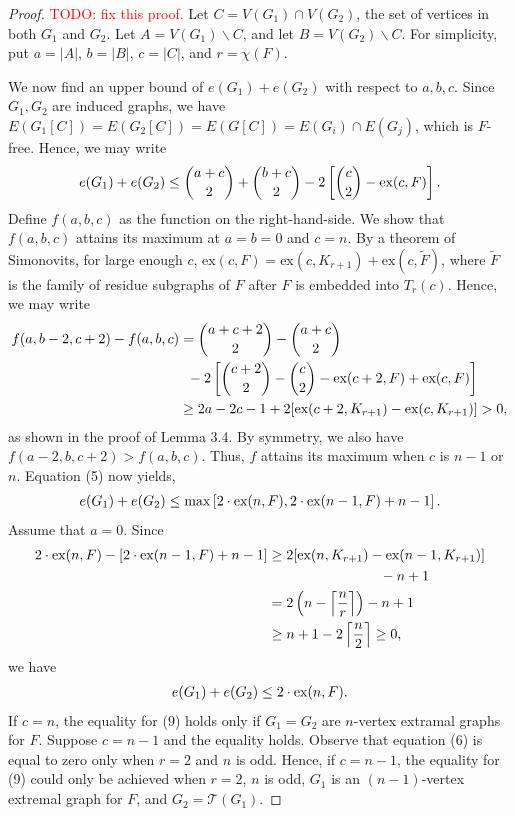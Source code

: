 \documentclass[12pt]{report}
\begin{document}
\begin{proof}
	\textcolor{red}{TODO: fix this proof.}
  Let $C = V(G_1) \cap V(G_2)$, the set of vertices in both $G_1$ and $G_2$. Let $A = V(G_1)
  \backslash C$, and let $B = V(G_2) \backslash C$. For simplicity, put $a = |A|$, $b = |B|$, $c =
  |C|$, and $r = \chi(F)$.

  We now find an upper bound of $e(G_1) + e(G_2)$ with respect to $a, b, c$. Since $G_1, G_2$ are
  induced graphs, we have $E(G_1[C]) = E(G_2[C]) = E(G[C]) = E(G_i) \cap E(G_j)$, which is $F$-free.
  Hence, we may write
  \begin{gather}
    e(G_1) + e(G_2) \leq \binom{a + c}{2} +  \binom{b + c}{2} - 2\left[\binom{c}{2} - \textnormal{ex}(c, F)\right].
  \end{gather}
  Define $f(a, b, c)$ as the function on the right-hand-side. We show that $f(a, b, c)$ attains its
  maximum at $a = b = 0$ and $c = n$. By a theorem of Simonovits, for large enough $c$,
  $\text{ex}(c, F) = \text{ex}(c, K_{r + 1}) + \text{ex}(c, \tilde{F})$, where $\tilde{F}$ is the
  family of residue subgraphs of $F$ after $F$ is embedded into $T_r(c)$. Hence, we may write
  \begin{align*}
    f(a, b - 2, c + 2) - f(a, b, c)
    &= \binom{a + c + 2}{2} - \binom{a + c}{2} \\
    &\;\; - 2\left[\binom{c + 2}{2} - \binom{c}{2} - \textnormal{ex}(c + 2, F) + \textnormal{ex}(c, F)\right] \\
    &\geq 2a - 2c - 1 + 2[\textnormal{ex}(c + 2, K_{r + 1}) - \textnormal{ex}(c, K_{r + 1})] > 0,
  \end{align*}
  as shown in the proof of Lemma 3.4. By symmetry, we also have $f(a - 2, b, c + 2) > f(a, b, c)$.
  Thus, $f$ attains its maximum when $c$ is $n - 1$ or $n$. Equation (5) now yields, 
  \begin{align*}
    e(G_1) + e(G_2) \leq \max\left[2 \cdot \textnormal{ex}(n, F), 2 \cdot \textnormal{ex}(n - 1, F) + n - 1\right].
  \end{align*}
  Assume that $a = 0$. Since
  \begin{align}
    2 \cdot \textnormal{ex}(n, F) - [2 \cdot \textnormal{ex}(n - 1, F) + n - 1]
    &\geq 2[\textnormal{ex}(n, K_{r + 1}) - \textnormal{ex}(n - 1, K_{r + 1})] \\
    &\qquad\qquad\qquad\qquad - n + 1 \\
    &= 2\left(n - \left\lceil \frac{n}{r} \right\rceil\right) - n + 1 \\
    &\geq n + 1 - 2\left\lceil \frac{n}{2} \right\rceil \geq 0, \nonumber
  \end{align}
  we have
  \begin{gather}
    e(G_1) + e(G_2) \leq 2 \cdot \textnormal{ex}(n, F).
  \end{gather}
  If $c = n$, the equality for (9) holds only if $G_1 = G_2$ are $n$-vertex extramal graphs for $F$.
  Suppose $c = n - 1$ and the equality holds. Observe that equation (6) is equal to zero only when
  $r = 2$ and $n$ is odd. Hence, if $c = n - 1$, the equality for (9) could only be achieved when $r
  = 2$, $n$ is odd, $G_1$ is an $(n - 1)$-vertex extremal graph for $F$, and $G_2 =
  \mathcal{T}(G_1)$.
\end{proof}
\end{document}
